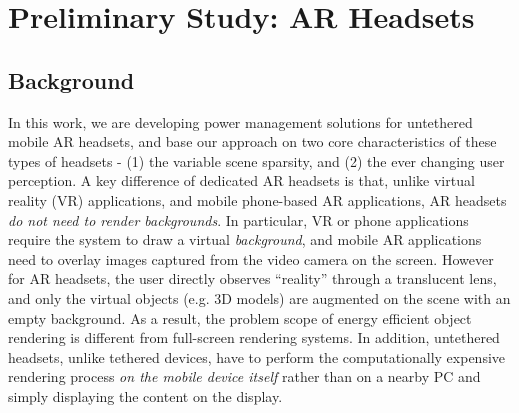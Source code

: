 \section{Preliminary Study: AR Headsets}
\label{sec:preliminary}

\subsection{Background}
\label{sec:background}

%

\begin{comment}

However, prior studies raise three questions that need to be answered
when designing an energy management scheme using perceptual information;
%
(1) What sources of information on human perception can we access?
(2) How can we recognize human perception using sensory data?, and
(3) What can we do to reduce energy usage?
%
Our approach is to address the energy efficiency problem on mobile HMDs
by answering each of these three questions.

\end{comment}


In this work, we are developing power management solutions for untethered mobile AR headsets, and base our approach on two core characteristics of these types of headsets - (1) the variable scene sparsity, and (2) the ever changing user perception. A key difference of dedicated AR headsets is that, unlike virtual reality (VR) applications, and mobile phone-based AR applications, AR headsets \emph{do not need to render backgrounds}. In particular, VR or phone applications require the system to draw a virtual \textit{background}, and mobile AR applications need to overlay images captured from the video camera on the screen. However for AR headsets, the user directly observes ``reality'' through a translucent lens, and only the virtual objects (e.g. 3D models) are augmented on the scene with an empty background. As a result, the problem  scope of energy efficient object rendering is different from full-screen rendering systems. In addition, untethered headsets, unlike tethered devices, have to perform the computationally expensive rendering process \textit{on the mobile device itself} rather than on a nearby PC and simply displaying the content on the display.

